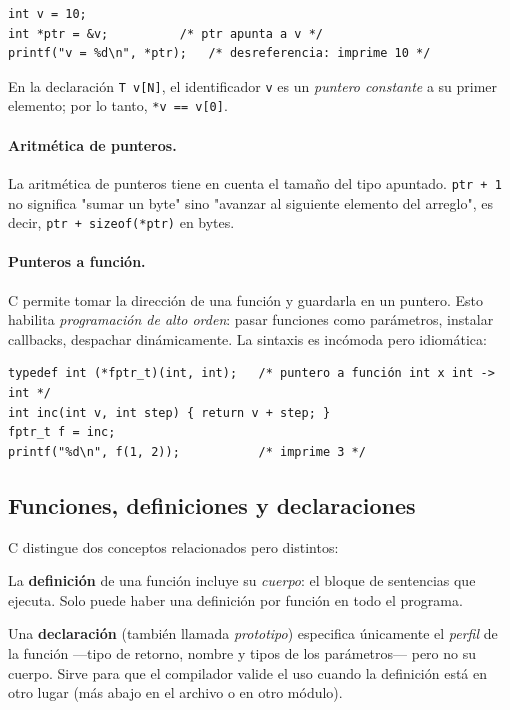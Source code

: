 \documentclass[11pt,a4paper]{article}
\begin{document}
\begin{lstlisting}[style=cstyle]
int v = 10;
int *ptr = &v;          /* ptr apunta a v */
printf("v = %d\n", *ptr);   /* desreferencia: imprime 10 */
\end{lstlisting}

En la declaración \texttt{T v[N]}, el identificador \texttt{v} es un
\emph{puntero constante} a su primer elemento; por lo tanto, \texttt{*v
== v[0]}.

\paragraph{Aritmética de punteros.}
La aritmética de punteros tiene en cuenta el tamaño del tipo apuntado.
\texttt{ptr + 1} no significa "sumar un byte" sino "avanzar al siguiente
elemento del arreglo", es decir, \texttt{ptr + sizeof(*ptr)} en bytes.

\paragraph{Punteros a función.}
C permite tomar la dirección de una función y guardarla en un puntero.
Esto habilita \emph{programación de alto orden}: pasar funciones como
parámetros, instalar callbacks, despachar dinámicamente. La sintaxis es
incómoda pero idiomática:

\begin{lstlisting}[style=cstyle]
typedef int (*fptr_t)(int, int);   /* puntero a función int x int -> int */
int inc(int v, int step) { return v + step; }
fptr_t f = inc;
printf("%d\n", f(1, 2));           /* imprime 3 */
\end{lstlisting}

\subsection{Funciones, definiciones y declaraciones}

C distingue dos conceptos relacionados pero distintos:

\begin{definicion}
La \textbf{definición} de una función incluye su \emph{cuerpo}: el
bloque de sentencias que ejecuta. Solo puede haber una definición por
función en todo el programa.
\end{definicion}

\begin{definicion}
Una \textbf{declaración} (también llamada \emph{prototipo}) especifica
únicamente el \emph{perfil} de la función ---tipo de retorno, nombre y
tipos de los parámetros--- pero no su cuerpo. Sirve para que el
compilador valide el uso cuando la definición está en otro lugar (más
abajo en el archivo o en otro módulo).
\end{definicion}
\end{document}
